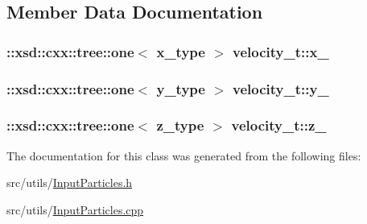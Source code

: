\subsection{Member Data Documentation}
\hypertarget{classvelocity__t_a648b432726339999caac51c3c72cb0de}{
\subsubsection[{x\-\_\-}]{\setlength{\rightskip}{0pt plus 5cm}\-::xsd\-::cxx\-::tree\-::one$<$ {\bf x\-\_\-type} $>$ velocity\-\_\-t\-::x\-\_\-\hspace{0.3cm}{\ttfamily [protected]}}}\label{classvelocity__t_a648b432726339999caac51c3c72cb0de}
\hypertarget{classvelocity__t_a6440f1e25ccd5916aff385482257ea71}{
\subsubsection[{y\-\_\-}]{\setlength{\rightskip}{0pt plus 5cm}\-::xsd\-::cxx\-::tree\-::one$<$ {\bf y\-\_\-type} $>$ velocity\-\_\-t\-::y\-\_\-\hspace{0.3cm}{\ttfamily [protected]}}}\label{classvelocity__t_a6440f1e25ccd5916aff385482257ea71}
\hypertarget{classvelocity__t_a86e3de3b673d7c4f67aae4c3d866c17d}{
\subsubsection[{z\-\_\-}]{\setlength{\rightskip}{0pt plus 5cm}\-::xsd\-::cxx\-::tree\-::one$<$ {\bf z\-\_\-type} $>$ velocity\-\_\-t\-::z\-\_\-\hspace{0.3cm}{\ttfamily [protected]}}}\label{classvelocity__t_a86e3de3b673d7c4f67aae4c3d866c17d}


The documentation for this class was generated from the following files\-:\begin{DoxyCompactItemize}
\item 
src/utils/\hyperlink{InputParticles_8h}{Input\-Particles.\-h}\item 
src/utils/\hyperlink{InputParticles_8cpp}{Input\-Particles.\-cpp}\end{DoxyCompactItemize}

